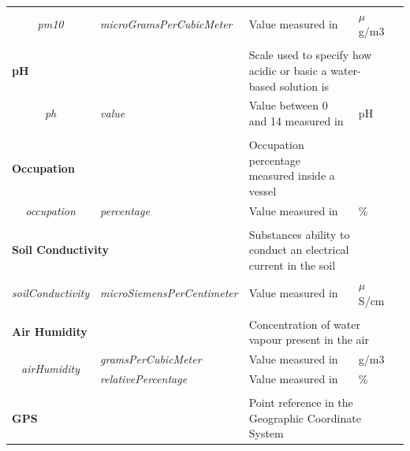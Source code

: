 \begin{landscape}
\begin{longtable}{cllll}
   \textit{pm10}                         & \textit{microGramsPerCubicMeter}   & Value measured in                                      & $\mu$g/m3                      &  \\ [0.4em] \cline{1-4}
   \\[-0.85em]
   \multicolumn{2}{l}{\textbf{pH}}                                            & \multicolumn{2}{l}{Scale used to specify how acidic or basic a water-based solution is} &  \\
   \textit{ph}                           & \textit{value}                     & Value between 0 and 14 measured in                     & pH                             &  \\ [0.4em] \cline{1-4}
   \\[-0.85em]
   \multicolumn{2}{l}{\textbf{Occupation}}                                    & Occupation percentage measured inside a vessel         &                                &  \\
   \textit{occupation}                   & \textit{percentage}                & Value measured in                                      & \%                             &  \\ [0.4em] \cline{1-4}
   \\[-0.85em]
   \multicolumn{2}{l}{\textbf{Soil Conductivity}}                             & \multicolumn{2}{l}{Substances ability to conduct an electrical current in the soil}     &  \\
   \textit{soilConductivity}             & \textit{microSiemensPerCentimeter} & Value measured in                                      & $\mu$S/cm                      &  \\ [0.4em] \cline{1-4}
   \\[-0.85em]
   \multicolumn{2}{l}{\textbf{Air Humidity}}                                  & \multicolumn{2}{l}{Concentration of water vapour present in the air}                    &  \\
   \multirow{2}{*}{\textit{airHumidity}} & \textit{gramsPerCubicMeter}        & Value measured in                                      & g/m3                           &  \\
                                         & \textit{relativePercentage}        & Value measured in                                      & \%                             &  \\ [0.4em] \cline{1-4}
   \\[-0.85em]
   \multicolumn{2}{l}{\textbf{GPS}}                                           & \multicolumn{2}{l}{Point reference in the Geographic Coordinate System}                 &  \\

\end{longtable}
\end{landscape}
